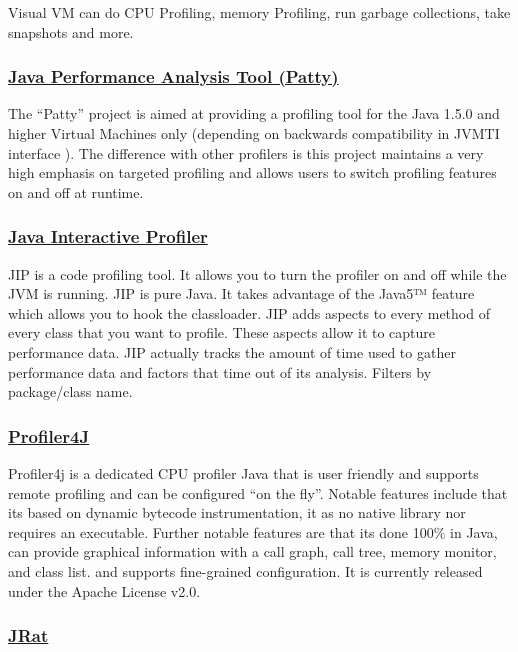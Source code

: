 Visual VM can do CPU Profiling, memory Profiling, run garbage collections, take snapshots and more.


\subsubsection{\href{http://patty.sourceforge.net/}{Java Performance Analysis Tool (Patty)}}

The ``Patty'' project is aimed at providing a profiling tool for the Java 1.5.0 and higher Virtual Machines only (depending on backwards compatibility in JVMTI interface ). The difference with other profilers is this project maintains a very high emphasis on targeted profiling and allows users to switch profiling features on and off at runtime.


\subsubsection{\href{http://jiprof.sourceforge.net/}{Java Interactive Profiler}}

JIP is a code profiling tool. It allows you to turn the profiler on and off while the JVM is running. JIP is pure Java. It takes advantage of the Java5™ feature which allows you to hook the classloader. JIP adds aspects to every method of every class that you want to profile. These aspects allow it to capture performance data. JIP actually tracks the amount of time used to gather performance data and factors that time out of its analysis. Filters by package/class name.


\subsubsection{\href{http://profiler4j.sourceforge.net/}{Profiler4J}}

Profiler4j is a dedicated CPU profiler Java that is user friendly and supports remote profiling and can be configured “on the fly”. Notable features include that its based on dynamic bytecode instrumentation, it as no native library nor requires an executable. Further notable features are that its done 100\% in Java, can provide graphical information with a call graph, call tree, memory monitor, and class list. and supports fine-grained configuration. It is currently released under the Apache License v2.0.


\subsubsection{\href{http://jrat.sourceforge.net/}{JRat}}

